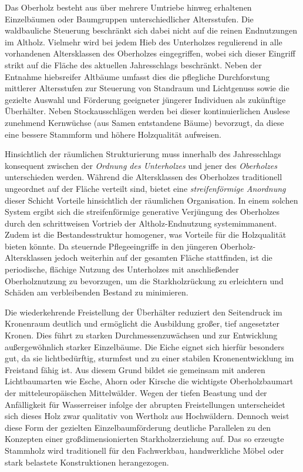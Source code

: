 \documentclass[twocolumn, bibliography=totoc, abstract=true]{scrartcl}
\begin{document}
Das Oberholz besteht aus über mehrere Umtriebe hinweg erhaltenen Einzelbäumen oder Baumgruppen unterschiedlicher Altersstufen. Die waldbauliche Steuerung beschränkt sich dabei nicht auf die reinen Endnutzungen im Altholz. Vielmehr wird bei jedem Hieb des Unterholzes regulierend in alle vorhandenen Altersklassen des Oberholzes eingegriffen, wobei sich dieser Eingriff strikt auf die Fläche des aktuellen Jahresschlags beschränkt. Neben der Entnahme hiebsreifer Altbäume umfasst dies die pflegliche Durchforstung mittlerer Altersstufen zur Steuerung von Standraum und Lichtgenuss sowie die gezielte Auswahl und Förderung geeigneter jüngerer Individuen als zukünftige Überhälter. Neben Stockausschlägen werden bei dieser kontinuierlichen Auslese zunehmend Kernwüchse (aus Samen entstandene Bäume) bevorzugt, da diese eine bessere Stammform und höhere Holzqualität aufweisen. 

Hinsichtlich der räumlichen Strukturierung muss innerhalb des Jahresschlags konsequent zwischen der \emph{Ordnung des Unterholzes} und jener des \emph{Oberholzes} unterschieden werden. Während die Altersklassen des Oberholzes traditionell ungeordnet auf der Fläche verteilt sind, bietet eine \emph{streifenförmige Anordnung} dieser Schicht Vorteile hinsichtlich der räumlichen Organisation. In einem solchen System ergibt sich die streifenförmige generative Verjüngung des Oberholzes durch den schrittweisen Vortrieb der Altholz-Endnutzung systemimmanent. Zudem ist die Bestandesstruktur homogener, was Vorteile für die Holzqualität bieten könnte. Da steuernde Pflegeeingriffe in den jüngeren Oberholz-Altersklassen jedoch weiterhin auf der gesamten Fläche stattfinden, ist die periodische, flächige Nutzung des Unterholzes mit anschließender Oberholznutzung zu bevorzugen, um die Starkholzrückung zu erleichtern und Schäden am verbleibenden Bestand zu minimieren.

Die wiederkehrende Freistellung der Überhälter reduziert den Seitendruck im Kronenraum deutlich und ermöglicht die Ausbildung großer, tief angesetzter Kronen. Dies führt zu starken Durchmessenzuwächsen und zur Entwicklung außergewöhnlich starker Einzelbäume. Die Eiche eignet sich hierfür besonders gut, da sie lichtbedürftig, sturmfest und zu einer stabilen Kronenentwicklung im Freistand fähig ist. Aus diesem Grund bildet sie gemeinsam mit anderen Lichtbaumarten wie Esche, Ahorn oder Kirsche die wichtigste Oberholzbaumart der mitteleuropäischen Mittelwälder. Wegen der tiefen Beastung und der Anfälligkeit für Wasserreiser infolge der abrupten Freistellungen unterscheidet sich dieses Holz zwar qualitativ von Wertholz aus Hochwäldern. Dennoch weist diese Form der gezielten Einzelbaumförderung deutliche Parallelen zu den Konzepten einer großdimensionierten Starkholzerziehung auf. Das so erzeugte Stammholz wird traditionell für den Fachwerkbau, handwerkliche Möbel oder stark belastete Konstruktionen herangezogen.
\end{document}
